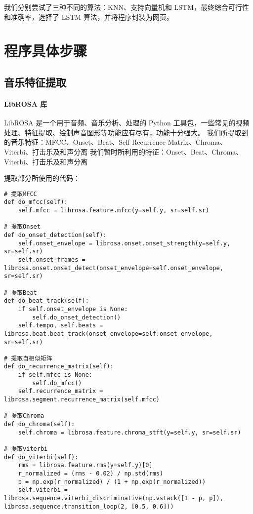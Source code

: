 \documentclass[a4paper,utf8,10pt]{article}
\begin{document}
我们分别尝试了三种不同的算法：KNN、支持向量机和 LSTM，最终综合可行性和准确率，选择了 LSTM 算法，并将程序封装为网页。

\section{程序具体步骤}
\subsection{音乐特征提取}
\paragraph{LibROSA 库} LibROSA 是一个用于音频、音乐分析、处理的 Python 工具包，一些常见的视频处理、特征提取、绘制声音图形等功能应有尽有，功能十分强大。
我们所提取到的音乐特征：MFCC、Onset、Beat、Self Recurrence Matrix、Chroma、Viterbi、打击乐及和声分离
我们暂时所利用的特征：Onset、Beat、Chroma、Viterbi、打击乐及和声分离

$\:$\\提取部分所使用的代码：
\begin{verbatim}
# 提取MFCC
def do_mfcc(self):
    self.mfcc = librosa.feature.mfcc(y=self.y, sr=self.sr)

# 提取Onset
def do_onset_detection(self):
    self.onset_envelope = librosa.onset.onset_strength(y=self.y, sr=self.sr)
    self.onset_frames = librosa.onset.onset_detect(onset_envelope=self.onset_envelope, sr=self.sr)

# 提取Beat
def do_beat_track(self):
    if self.onset_envelope is None:
        self.do_onset_detection()
    self.tempo, self.beats = librosa.beat.beat_track(onset_envelope=self.onset_envelope, sr=self.sr)

# 提取自相似矩阵
def do_recurrence_matrix(self):
    if self.mfcc is None:
        self.do_mfcc()
    self.recurrence_matrix = librosa.segment.recurrence_matrix(self.mfcc)

# 提取Chroma
def do_chroma(self):
    self.chroma = librosa.feature.chroma_stft(y=self.y, sr=self.sr)

# 提取viterbi
def do_viterbi(self):
    rms = librosa.feature.rms(y=self.y)[0]
    r_normalized = (rms - 0.02) / np.std(rms)
    p = np.exp(r_normalized) / (1 + np.exp(r_normalized))
    self.viterbi = librosa.sequence.viterbi_discriminative(np.vstack([1 - p, p]), librosa.sequence.transition_loop(2, [0.5, 0.6]))
\end{verbatim}
\end{document}
